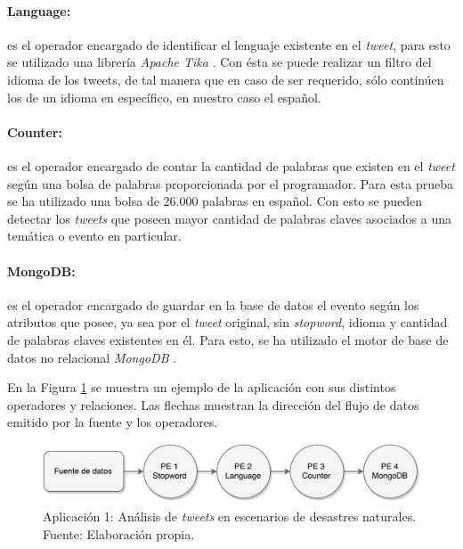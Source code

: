 \paragraph{Language:} es el operador encargado de identificar el lenguaje existente en el \textit{tweet}, para esto se utilizado una librer\'ia \textit{Apache Tika} \citep{mattmann2011tika}. Con \'esta se puede realizar un filtro del idioma de los tweets, de tal manera que en caso de ser requerido, s\'olo contin\'uen los de un idioma en espec\'ifico, en nuestro caso el espa\~nol.

\paragraph{Counter:} es el operador encargado de contar la cantidad de palabras que existen en el \textit{tweet} seg\'un una bolsa de palabras proporcionada por el programador. Para esta prueba se ha utilizado una bolsa de 26.000 palabras en espa\~nol. Con esto se pueden detectar los \textit{tweets} que poseen mayor cantidad de palabras claves asociados a una tem\'atica o evento en particular.

\paragraph{MongoDB:} es el operador encargado de guardar en la base de datos el evento seg\'un los atributos que posee, ya sea por el \textit{tweet} original, sin \textit{stopword}, idioma y cantidad de palabras claves existentes en \'el. Para esto, se ha utilizado el motor de base de datos no relacional \textit{MongoDB} \citep{chodorow2013mongodb}.

En la Figura \ref{fig:primeraAplicacion} se muestra un ejemplo de la aplicaci\'on con sus distintos operadores y relaciones. Las flechas muestran la direcci\'on del flujo de datos emitido por la fuente y los operadores.

\begin{figure}[!hb]
	\centering
	\captionsetup{justification=centering}
		\includegraphics[scale=0.6]{images/App1.pdf}
	\caption[Aplicaci\'on 1: An\'alisis de \textit{tweets} en escenarios de desastres naturales.]{Aplicaci\'on 1: An\'alisis de \textit{tweets} en escenarios de desastres naturales.\\Fuente: Elaboraci\'on propia.}
	\label{fig:primeraAplicacion}
\end{figure}

